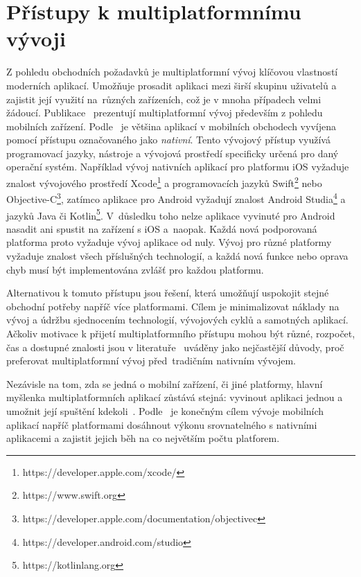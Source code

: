 \section{Přístupy k multiplatformnímu vývoji}
\label{Multiplatformni}
Z pohledu obchodních požadavků je multiplatformní vývoj klíčovou vlastností moderních aplikací. Umožňuje prosadit aplikaci mezi širší skupinu uživatelů a zajistit její využití na~různých zařízeních, což je v mnoha případech velmi žádoucí. Publikace~\cite{CrossPlatformSurvey, Taxonomy} prezentují multiplatformní vývoj především z pohledu mobilních zařízení. Podle~\cite{CrossPlatformSurvey} je většina aplikací v mobilních obchodech vyvíjena pomocí přístupu označovaného jako \textit{nativní}. Tento vývojový přístup využívá programovací jazyky, nástroje a vývojová prostředí specificky určená pro daný operační systém. Například vývoj nativních aplikací pro platformu iOS vyžaduje znalost vývojového prostředí Xcode\footnote{https://developer.apple.com/xcode/} a programovacích jazyků Swift\footnote{https://www.swift.org} nebo Objective-C\footnote{https://developer.apple.com/documentation/objectivec}, zatímco aplikace pro Android vyžadují znalost Android Studia\footnote{https://developer.android.com/studio} a jazyků Java či Kotlin\footnote{https://kotlinlang.org}. V~důsledku toho nelze aplikace vyvinuté pro Android nasadit ani spustit na zařízení s iOS a~naopak. Každá nová podporovaná platforma proto vyžaduje vývoj aplikace od nuly. Vývoj pro různé platformy vyžaduje znalost všech příslušných technologií, a každá nová funkce nebo oprava chyb musí být implementována zvlášť pro každou platformu.

Alternativou k tomuto přístupu jsou řešení, která umožňují uspokojit stejné obchodní potřeby napříč více platformami. Cílem je minimalizovat náklady na vývoj a údržbu sjednocením technologií, vývojových cyklů a samotných aplikací. Ačkoliv motivace k přijetí multiplatformního přístupu mohou být různé, rozpočet, čas a dostupné znalosti jsou v literatuře~\cite{CrossPlatformSurvey} uváděny jako nejčastější důvody, proč preferovat multiplatformní vývoj před~tradičním nativním vývojem.

Nezávisle na tom, zda se jedná o mobilní zařízení, či jiné platformy, hlavní myšlenka multiplatformních aplikací zůstává stejná: vyvinout aplikaci jednou a umožnit její spuštění kdekoli~\cite{CrossPlatform}. Podle~\cite{CrossPlatformSurvey} je konečným cílem vývoje mobilních aplikací napříč platformami dosáhnout výkonu srovnatelného s nativními aplikacemi a zajistit jejich běh na co největším počtu platforem.

